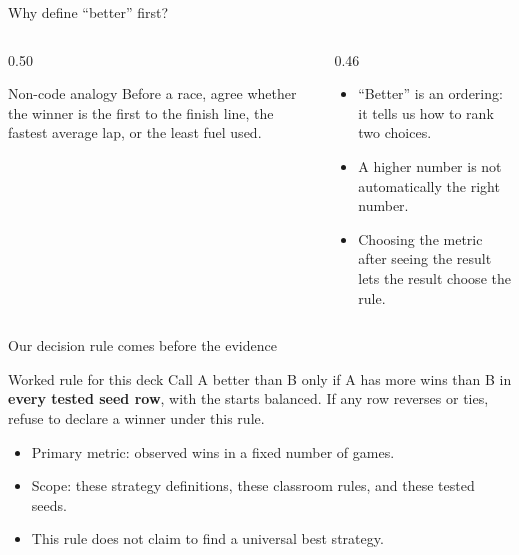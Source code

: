 \begin{frame}{Why define ``better'' first?}
\begin{columns}[T]
\begin{column}{0.50\textwidth}
\begin{block}{Non-code analogy}
Before a race, agree whether the winner is the first to the finish line, the fastest average lap, or the least fuel used.
\end{block}
\end{column}
\begin{column}{0.46\textwidth}
\begin{itemize}
\item ``Better'' is an ordering: it tells us how to rank two choices.
\item A higher number is not automatically the right number.
\item Choosing the metric after seeing the result lets the result choose the rule.
\end{itemize}
\end{column}
\end{columns}
\end{frame}

\begin{frame}[shrink=18]{Our decision rule comes before the evidence}
\begin{block}{Worked rule for this deck}
Call A better than B only if A has more wins than B in \textbf{every tested seed row}, with the starts balanced. If any row reverses or ties, refuse to declare a winner under this rule.
\end{block}
\begin{itemize}
\item Primary metric: observed wins in a fixed number of games.
\item Scope: these strategy definitions, these classroom rules, and these tested seeds.
\item This rule does not claim to find a universal best strategy.
\end{itemize}
\end{frame}

